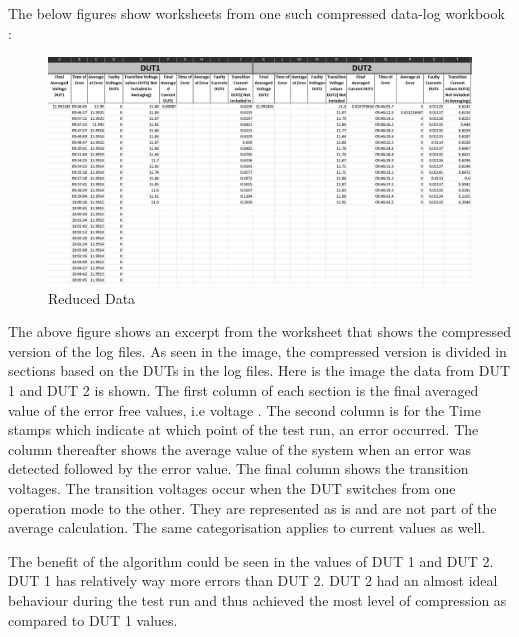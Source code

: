 The below figures show worksheets from one such compressed data-log workbook :

\begin{figure}
    	\centering
    	\includegraphics[width= 1\textwidth]{images/Worksheet 1.png}
    	\caption [Reduced Data]{Reduced Data}  
    	\label{fig:Reduced Data}
\end{figure}

The above figure shows an excerpt from the worksheet that shows the compressed version of the log files. As seen in the image, the compressed version is divided in sections based on the DUTs in the log files. Here is the image the data from DUT 1 and DUT 2 is shown. The first column of each section is the final averaged value of the error free values, i.e voltage . The second column is for the Time stamps which indicate at which point of the test run, an error occurred. The column thereafter shows the average value of the system when an error was detected followed by the error value. The final column shows the transition voltages. The transition voltages occur when the DUT switches from one operation mode to the other. They are represented as is and are not part of the average calculation. The same categorisation applies to current values as well. 

The benefit of the algorithm could be seen in the values of DUT 1 and DUT 2. DUT 1 has relatively way more errors than DUT 2. DUT 2 had an almost ideal behaviour during the test run and thus achieved the most level of compression as compared to DUT 1 values. 

